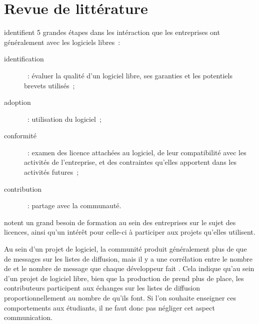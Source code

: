 \chapter{Revue de littérature}

 identifient 5 grandes étapes dans les intéraction que les entreprises ont
généralement avec les logiciels libres :
\begin{description}
    \item[identification] : évaluer la qualité d'un logiciel libre, ses garanties et les potentiels brevets
        utilisés ;
    \item[adoption] : utilisation du logiciel ;
    \item[conformité] : examen des licence attachées au logiciel, de leur compatibilité avec les activités de
        l'entreprise, et des contraintes qu'elles apportent dans les activités futures ;
    \item[contribution] : partage avec la communauté.
\end{description}

\textcite{strategies-2012} notent un grand besoin de formation au sein des entreprises sur le sujet des
licences, ainsi qu'un intérêt pour celle-ci à participer aux projets qu'elles utilisent.

Au sein d'un projet de logiciel, la communité produit généralement plus de  que de messages sur
les listes de diffusion, mais il y a une corrélation entre le nombre de  et le nombre de
message que chaque développeur fait . Cela indique qu'au sein d'un
projet de logiciel libre, bien que la production de  prend plus de place, les contributeurs
participent aux échanges sur les listes de diffusion proportionnellement au nombre de  qu'ils
font. Si l'on souhaite enseigner ces comportements aux étudiants, il ne faut donc pas négliger cet aspect
communication.
